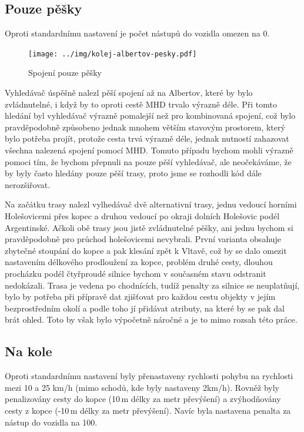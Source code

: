 \subsection{Pouze pěšky}
Oproti standardnímu nastavení je počet nástupů do vozidla omezen na 0.
\begin{figure}[h]
  \centering
    \texttt{[image: ../img/kolej-albertov-pesky.pdf]}
  \caption{Spojení pouze pěšky}
  \label{fig:kolej-albertov-pesky}
\end{figure}

Vyhledávač úspěšně nalezl pěší spojení až na Albertov, které by bylo
zvládnutelné, i když by to oproti cestě MHD trvalo výrazně déle. Při tomto
hledání byl vyhledávač výrazně pomalejší než pro kombinovaná spojení, což bylo
pravděpodobně způsobeno jednak mnohem větším stavovým prostorem, který bylo
potřeba projít, protože cesta trvá výrazně déle, jednak nutností zahazovat
všechna nalezená spojení pomocí MHD. Tomuto případu bychom mohli výrazně pomoci
tím, že bychom přepnuli na pouze pěší vyhledávač, ale neočekáváme, že by byly
často hledány pouze pěší trasy, proto jsme se rozhodli kód dále nerozšiřovat.

Na začátku trasy nalezl vylhedávač dvě alternativní trasy, jednu vedoucí horními
Holešovicemi přes kopec a druhou vedoucí po okraji dolních Holešovic podél
Argentinské. Ačkoli obě trasy jsou jistě zvládnutelné pěšky, ani jednu bychom si
pravděpodobně pro průchod holešovicemi nevybrali. První varianta obsahuje
zbytečné stoupání do kopce a pak klesání zpět k Vltavě, což by se dalo omezit
nastavením délkového prodloužení za kopce, problém druhé cesty, dlouhou
procházku podél čtyřproudé silnice bychom v současném stavu odstranit
nedokázali. Trasa je vedena po chodnících, tudíž penalty za silnice se
neuplatňují, bylo by potřeba při přípravě dat zjišťovat pro každou cestu objekty
v jejím bezprostředním okolí a podle toho jí přidávat atributy, na které by se
pak dal brát ohled. Toto by však bylo výpočetně náročné a je to mimo rozsah této
práce.

\subsection{Na kole}
Oproti standardnímu nastavení byly přenastaveny rychlosti pohybu na rychlosti
mezi 10 a 25 km/h (mimo schodů, kde byly nastaveny 2km/h). Rovněž byly
penalizovány cesty do kopce (10\,m délky za metr převýšení) a zvýhodňovány cesty z
kopce (-10\,m délky za metr převýšení). Navíc byla nastavena penalta za nástup
do vozidla na 100.

